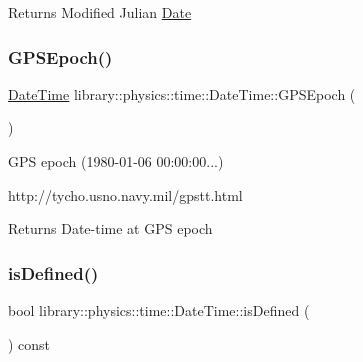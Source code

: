 \begin{DoxyReturn}{Returns}
Modified Julian \hyperlink{classlibrary_1_1physics_1_1time_1_1_date}{Date} 
\end{DoxyReturn}
\mbox{\label{classlibrary_1_1physics_1_1time_1_1_date_time_a24eadd0df51d4426f4be5618db93a8af}} 
\subsubsection{\texorpdfstring{G\+P\+S\+Epoch()}{GPSEpoch()}}
{\footnotesize\ttfamily \hyperlink{classlibrary_1_1physics_1_1time_1_1_date_time}{Date\+Time} library\+::physics\+::time\+::\+Date\+Time\+::\+G\+P\+S\+Epoch (\begin{DoxyParamCaption}{ }\end{DoxyParamCaption})\hspace{0.3cm}{\ttfamily [static]}}



G\+PS epoch (1980-\/01-\/06 00\+:00\+:00...) 

http\+://tycho.usno.\+navy.\+mil/gpstt.html

\begin{DoxyReturn}{Returns}
Date-\/time at G\+PS epoch 
\end{DoxyReturn}
\mbox{\label{classlibrary_1_1physics_1_1time_1_1_date_time_ae5726d0e5fd67f24af7b4fe66efd8a1f}} 
\subsubsection{\texorpdfstring{is\+Defined()}{isDefined()}}
{\footnotesize\ttfamily bool library\+::physics\+::time\+::\+Date\+Time\+::is\+Defined (\begin{DoxyParamCaption}{ }\end{DoxyParamCaption}) const}



